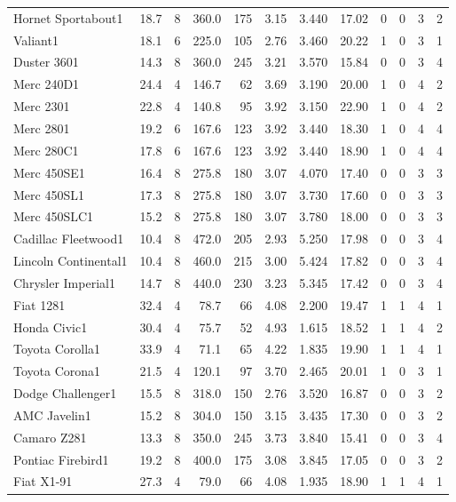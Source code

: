 \documentclass[table]{article}
\begin{document}
\begin{longtable}{lrrrrrrrrrrr}
Hornet Sportabout1 & 18.7 & 8 & 360.0 & 175 & 3.15 & 3.440 & 17.02 & 0 & 0 & 3 & 2\\
Valiant1 & 18.1 & 6 & 225.0 & 105 & 2.76 & 3.460 & 20.22 & 1 & 0 & 3 & 1\\
Duster 3601 & 14.3 & 8 & 360.0 & 245 & 3.21 & 3.570 & 15.84 & 0 & 0 & 3 & 4\\
Merc 240D1 & 24.4 & 4 & 146.7 & 62 & 3.69 & 3.190 & 20.00 & 1 & 0 & 4 & 2\\
\addlinespace
Merc 2301 & 22.8 & 4 & 140.8 & 95 & 3.92 & 3.150 & 22.90 & 1 & 0 & 4 & 2\\
Merc 2801 & 19.2 & 6 & 167.6 & 123 & 3.92 & 3.440 & 18.30 & 1 & 0 & 4 & 4\\
Merc 280C1 & 17.8 & 6 & 167.6 & 123 & 3.92 & 3.440 & 18.90 & 1 & 0 & 4 & 4\\
Merc 450SE1 & 16.4 & 8 & 275.8 & 180 & 3.07 & 4.070 & 17.40 & 0 & 0 & 3 & 3\\
Merc 450SL1 & 17.3 & 8 & 275.8 & 180 & 3.07 & 3.730 & 17.60 & 0 & 0 & 3 & 3\\
\addlinespace
Merc 450SLC1 & 15.2 & 8 & 275.8 & 180 & 3.07 & 3.780 & 18.00 & 0 & 0 & 3 & 3\\
Cadillac Fleetwood1 & 10.4 & 8 & 472.0 & 205 & 2.93 & 5.250 & 17.98 & 0 & 0 & 3 & 4\\
Lincoln Continental1 & 10.4 & 8 & 460.0 & 215 & 3.00 & 5.424 & 17.82 & 0 & 0 & 3 & 4\\
Chrysler Imperial1 & 14.7 & 8 & 440.0 & 230 & 3.23 & 5.345 & 17.42 & 0 & 0 & 3 & 4\\
Fiat 1281 & 32.4 & 4 & 78.7 & 66 & 4.08 & 2.200 & 19.47 & 1 & 1 & 4 & 1\\
\addlinespace
Honda Civic1 & 30.4 & 4 & 75.7 & 52 & 4.93 & 1.615 & 18.52 & 1 & 1 & 4 & 2\\
Toyota Corolla1 & 33.9 & 4 & 71.1 & 65 & 4.22 & 1.835 & 19.90 & 1 & 1 & 4 & 1\\
Toyota Corona1 & 21.5 & 4 & 120.1 & 97 & 3.70 & 2.465 & 20.01 & 1 & 0 & 3 & 1\\
Dodge Challenger1 & 15.5 & 8 & 318.0 & 150 & 2.76 & 3.520 & 16.87 & 0 & 0 & 3 & 2\\
AMC Javelin1 & 15.2 & 8 & 304.0 & 150 & 3.15 & 3.435 & 17.30 & 0 & 0 & 3 & 2\\
\addlinespace
Camaro Z281 & 13.3 & 8 & 350.0 & 245 & 3.73 & 3.840 & 15.41 & 0 & 0 & 3 & 4\\
Pontiac Firebird1 & 19.2 & 8 & 400.0 & 175 & 3.08 & 3.845 & 17.05 & 0 & 0 & 3 & 2\\
Fiat X1-91 & 27.3 & 4 & 79.0 & 66 & 4.08 & 1.935 & 18.90 & 1 & 1 & 4 & 1\\

\end{longtable}
\end{document}
